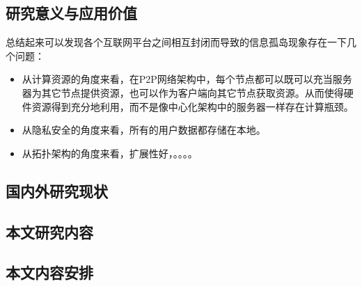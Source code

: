 \subsection{研究意义与应用价值}
总结起来可以发现各个互联网平台之间相互封闭而导致的信息孤岛现象存在一下几个问题：

\begin{itemize}
\item 从计算资源的角度来看，在P2P网络架构中，每个节点都可以既可以充当服务器为其它节点提供资源，也可以作为客户端向其它节点获取资源。从而使得硬件资源得到充分地利用，而不是像中心化架构中的服务器一样存在计算瓶颈。
\item 从隐私安全的角度来看，所有的用户数据都存储在本地。
\item 从拓扑架构的角度来看，扩展性好，。。。。
\end{itemize}

\subsection{国内外研究现状}

\subsection{本文研究内容}

\subsection{本文内容安排}

